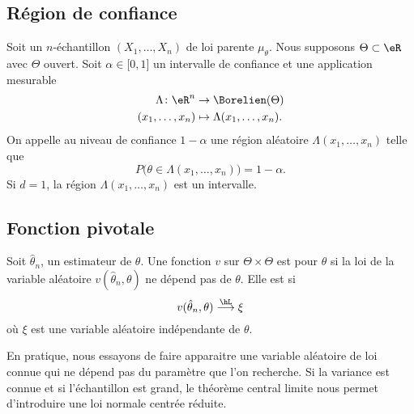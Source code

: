 \subsection{Région de confiance}

Soit un \( n\)-échantillon \( (X_1,\ldots,X_n)\) de loi parente \( \mu_{\theta}\). Nous supposons \( \Theta\subset\eR\) avec \( \Theta\) ouvert. Soit \( \alpha\in\mathopen[ 0 , 1 \mathclose]\) un intervalle de confiance et une application mesurable
\begin{equation}
	\begin{aligned}
		\Lambda\colon \eR^n & \to \Borelien(\Theta)            \\
		(x_1,\ldots,x_n)    & \mapsto \Lambda(x_1,\ldots,x_n).
	\end{aligned}
\end{equation}
On appelle  au niveau de confiance \( 1-\alpha\) une région aléatoire \( \Lambda(x_1,\ldots,x_n)\) telle que
\begin{equation}
	P\big( \theta\in\Lambda(x_1,\ldots,x_n) \big)=1-\alpha.
\end{equation}
Si \( d=1\), la région \( \Lambda(x_1,\ldots,x_n)\) est un intervalle.

\subsection{Fonction pivotale}

Soit \( \hat\theta_n\), un estimateur de \( \theta\). Une fonction \( v\) sur \( \Theta\times\Theta\) est  pour \( \theta\) si la loi de la variable aléatoire \( v(\hat\theta_n,\theta)\) ne dépend pas de \( \theta\). Elle est  si
\begin{equation}
	v(\hat\theta_n,\theta)\stackrel{\hL}{\longrightarrow}\xi
\end{equation}
où \( \xi\) est une variable aléatoire indépendante de \( \theta\).

En pratique, nous essayons de faire apparaitre une variable aléatoire de loi connue qui ne dépend pas du paramètre que l'on recherche. Si la variance est connue et si l'échantillon est grand, le théorème central limite nous permet d'introduire une loi normale centrée réduite.

